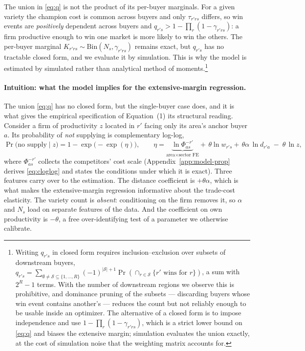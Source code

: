 The union in \eqref{eq:q} is not the product of its per-buyer marginals. For a given variety
the champion cost is common across buyers and only $\tau_{r'rs}$ differs, so win events are
\emph{positively} dependent across buyers and $q_{r's}>1-\prod_{r}(1-\gamma_{r'rs})$: a firm
productive enough to win one market is more likely to win the others. The per-buyer marginal
$K_{r'rs}\sim\mathrm{Bin}(N_{s},\gamma_{r'rs})$ remains exact, but $q_{r's}$ has no tractable
closed form, and we evaluate it by simulation. This is why the model is estimated by simulated
rather than analytical method of moments.\footnote{Writing $q_{r's}$ in closed form requires
inclusion--exclusion over subsets of downstream buyers,
$q_{r's}=\sum_{\emptyset\neq\mathcal{S}\subseteq\{1,\dots,R\}}(-1)^{|\mathcal{S}|+1}
\Pr(\cap_{r\in\mathcal{S}}\{\text{$r'$ wins for }r\})$, a sum with $2^{R}-1$ terms. With the
number of downstream regions we observe this is prohibitive, and dominance pruning of the
subsets --- discarding buyers whose win event contains another's --- reduces the count but not
reliably enough to be usable inside an optimizer. The alternative of a closed form is to impose
independence and use $1-\prod_{r}(1-\gamma_{r'rs})$, which is a strict lower bound on
\eqref{eq:q} and biases the extensive margin; simulation evaluates the union exactly, at the
cost of simulation noise that the weighting matrix accounts for.}

\paragraph{Intuition: what the model implies for the extensive-margin regression.} The union
\eqref{eq:q} has no closed form, but the single-buyer case does, and it is what gives the
empirical specification of Equation~(1) its structural reading. Consider a firm of productivity
$z$ located in $r'$ facing only its area's anchor buyer $a$. Its probability of \emph{not}
supplying is complementary log-log,
\begin{equation}
\Pr\big(\text{no supply}\mid z\big)=1-\exp\big(-\exp(\eta)\big),
\qquad
\eta=\underbrace{\ln\Phi^{-r'}_{as}}_{\text{area}\times\text{sector FE}}
+\,\theta\ln w_{r's}
+\,\theta\alpha\,\ln d_{r'a}
\;-\;\theta\,\ln z ,
\label{eq:cloglog}
\end{equation}
where $\Phi^{-r'}_{as}$ collects the competitors' cost scale (Appendix~\ref{app:model-prop}
derives \eqref{eq:cloglog} and states the conditions under which it is exact). Three features
carry over to the estimation. The distance coefficient is $+\theta\alpha$, which is what makes
the extensive-margin regression informative about the trade-cost elasticity. The variety count
is \emph{absent}: conditioning on the firm removes it, so $\alpha$ and $N_{s}$ load on separate
features of the data. And the coefficient on own productivity is $-\theta$, a free
over-identifying test of a parameter we otherwise calibrate.

